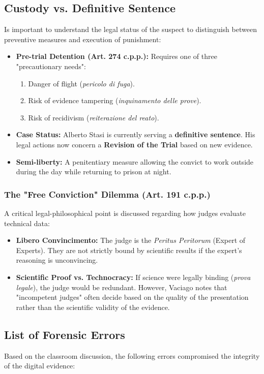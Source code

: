 \subsection{Custody vs. Definitive Sentence}
Is important to understand the legal status of the suspect to distinguish between preventive measures and execution of punishment:
\begin{itemize}
    \item \textbf{Pre-trial Detention (Art. 274 c.p.p.):} Requires one of three "precautionary needs": 
        \begin{enumerate}
            \item Danger of flight (\textit{pericolo di fuga}).
            \item Risk of evidence tampering (\textit{inquinamento delle prove}).
            \item Risk of recidivism (\textit{reiterazione del reato}).
        \end{enumerate}
    \item \textbf{Case Status:} Alberto Stasi is currently serving a \textbf{definitive sentence}. His legal actions now concern a \textbf{Revision of the Trial} based on new evidence.
    \item \textbf{Semi-liberty:} A penitentiary measure allowing the convict to work outside during the day while returning to prison at night.
\end{itemize}

\subsubsection{The "Free Conviction" Dilemma (Art. 191 c.p.p.)}
A critical legal-philosophical point is discussed regarding how judges evaluate technical data:
\begin{itemize}
    \item \textbf{Libero Convincimento:} The judge is the \textit{Peritus Peritorum} (Expert of Experts). They are not strictly bound by scientific results if the expert's reasoning is unconvincing.
    \item \textbf{Scientific Proof vs. Technocracy:} If science were legally binding (\textit{prova legale}), the judge would be redundant. However, Vaciago notes that "incompetent judges" often decide based on the quality of the presentation rather than the scientific validity of the evidence.
\end{itemize}

\subsection{List of Forensic Errors}
Based on the classroom discussion, the following errors compromised the integrity of the digital evidence:

